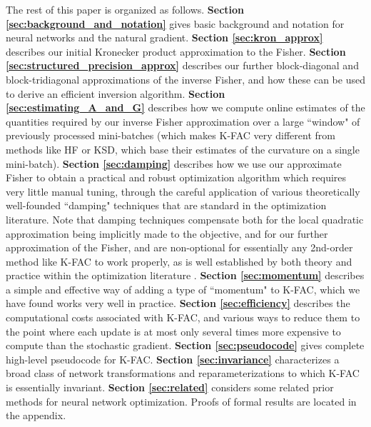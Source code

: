\documentclass[12pt]{article}
\newcommand{\acronym}{K-FAC}
\begin{document}
The rest of this paper is organized as follows.  \textbf{Section \ref{sec:background_and_notation}} gives basic background and notation for neural networks and the natural gradient.  \textbf{Section \ref{sec:kron_approx}} describes our initial Kronecker product approximation to the Fisher.  \textbf{Section \ref{sec:structured_precision_approx}} describes our further block-diagonal and block-tridiagonal approximations of the inverse Fisher, and how these can be used to derive an efficient inversion algorithm.  \textbf{Section \ref{sec:estimating_A_and_G}} describes how we compute online estimates of the quantities required by our inverse Fisher approximation  over a large ``window" of previously processed mini-batches (which makes \acronym{} very different from methods like HF or KSD, which base their estimates of the curvature on a single mini-batch).  \textbf{Section \ref{sec:damping}} describes how we use our approximate Fisher to obtain a practical and robust optimization algorithm which requires very little manual tuning, through the careful application of various theoretically well-founded ``damping" techniques that are standard in the optimization literature.  Note that damping techniques compensate both for the local quadratic approximation being implicitly made to the objective, and for our further approximation of the Fisher, and are non-optional for essentially any 2nd-order method like \acronym{} to work properly, as is well established by both theory and practice within the optimization literature \citep{nocedal_book}.  \textbf{Section \ref{sec:momentum}} describes a simple and effective way of adding a type of ``momentum" to \acronym{}, which we have found works very well in practice.  \textbf{Section \ref{sec:efficiency}} describes the computational costs associated with \acronym{}, and various ways to reduce them to the point where each update is at most only several times more expensive to compute than the stochastic gradient.  \textbf{Section \ref{sec:pseudocode}} gives complete high-level pseudocode for \acronym{}.  \textbf{Section \ref{sec:invariance}} characterizes a broad class of network transformations and reparameterizations to which \acronym{} is essentially invariant.  \textbf{Section \ref{sec:related}} considers some related prior methods for neural network optimization.  Proofs of formal results are located in the appendix.


\end{document}
